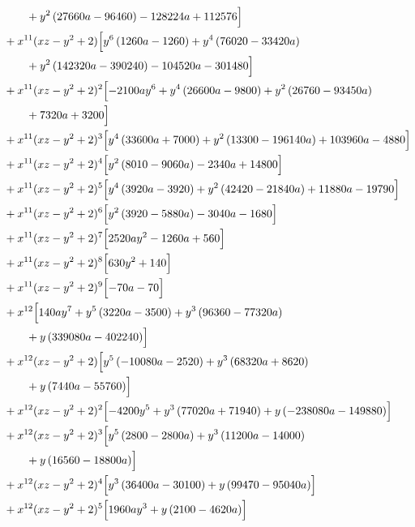 \begin{align*}
&\qquad + y^{2} \left(27660 a - 96460\right) - 128224 a + 112576\Bigr]\\
&{}+x^{11}(xz-y^2+2)\Bigl[y^{6} \left(1260 a - 1260\right) + y^{4} \left(76020 - 33420 a\right)\\
&\qquad + y^{2} \left(142320 a - 390240\right) - 104520 a - 301480\Bigr]\\
&{}+x^{11}(xz-y^2+2)^{2}\Bigl[- 2100 a y^{6} + y^{4} \left(26600 a - 9800\right) + y^{2} \left(26760 - 93450 a\right)\\
&\qquad + 7320 a + 3200\Bigr]\\
&{}+x^{11}(xz-y^2+2)^{3}\Bigl[y^{4} \left(33600 a + 7000\right) + y^{2} \left(13300 - 196140 a\right) + 103960 a - 4880\Bigr]\\
&{}+x^{11}(xz-y^2+2)^{4}\Bigl[y^{2} \left(8010 - 9060 a\right) - 2340 a + 14800\Bigr]\\
&{}+x^{11}(xz-y^2+2)^{5}\Bigl[y^{4} \left(3920 a - 3920\right) + y^{2} \left(42420 - 21840 a\right) + 11880 a - 19790\Bigr]\\
&{}+x^{11}(xz-y^2+2)^{6}\Bigl[y^{2} \left(3920 - 5880 a\right) - 3040 a - 1680\Bigr]\\
&{}+x^{11}(xz-y^2+2)^{7}\Bigl[2520 a y^{2} - 1260 a + 560\Bigr]\\
&{}+x^{11}(xz-y^2+2)^{8}\Bigl[630 y^{2} + 140\Bigr]\\
&{}+x^{11}(xz-y^2+2)^{9}\Bigl[- 70 a - 70\Bigr]\\
&{}+x^{12}\Bigl[140 a y^{7} + y^{5} \left(3220 a - 3500\right) + y^{3} \left(96360 - 77320 a\right)\\
&\qquad + y \left(339080 a - 402240\right)\Bigr]\\
&{}+x^{12}(xz-y^2+2)\Bigl[y^{5} \left(- 10080 a - 2520\right) + y^{3} \left(68320 a + 8620\right)\\
&\qquad + y \left(7440 a - 55760\right)\Bigr]\\
&{}+x^{12}(xz-y^2+2)^{2}\Bigl[- 4200 y^{5} + y^{3} \left(77020 a + 71940\right) + y \left(- 238080 a - 149880\right)\Bigr]\\
&{}+x^{12}(xz-y^2+2)^{3}\Bigl[y^{5} \left(2800 - 2800 a\right) + y^{3} \left(11200 a - 14000\right)\\
&\qquad + y \left(16560 - 18800 a\right)\Bigr]\\
&{}+x^{12}(xz-y^2+2)^{4}\Bigl[y^{3} \left(36400 a - 30100\right) + y \left(99470 - 95040 a\right)\Bigr]\\
&{}+x^{12}(xz-y^2+2)^{5}\Bigl[1960 a y^{3} + y \left(2100 - 4620 a\right)\Bigr]\\

\end{align*}
